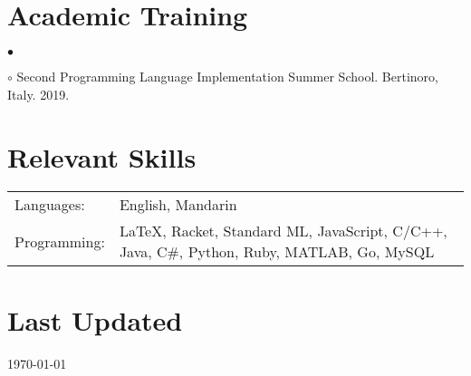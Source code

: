 \documentclass[margin,line]{res}
\newenvironment{list2}{
  \begin{list}{$\bullet$}{%
      \setlength{\itemsep}{0in}
      \setlength{\parsep}{0in} \setlength{\parskip}{0in}
      \setlength{\topsep}{0in} \setlength{\partopsep}{0in}
      \setlength{\leftmargin}{0.2in}}}{\end{list}}
\begin{document}
\begin{resume}


\section{\sc Academic Training}

\begin{list2}
\item[$\circ$] Second Programming Language Implementation Summer School. Bertinoro, Italy. 2019.
\end{list2}


\section{\sc Relevant Skills}

\vspace{.05in}
\begin{tabular}{@{}p{0.8in}p{4.25in}}

Languages:& English, Mandarin \\
Programming:& \LaTeX, Racket, Standard ML, JavaScript, C/C++, Java, C\#, Python, Ruby, MATLAB, Go, MySQL

\end{tabular}


\section{\sc Last Updated}
\today


\end{resume}
\end{document}
